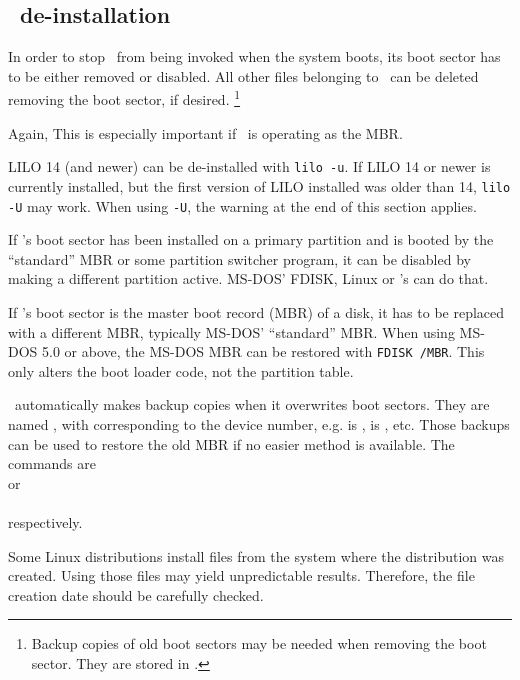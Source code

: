 \subsection{\LILO\ de-installation}
\label{deinst}

In order to stop \LILO\ from being invoked when the system boots, its
boot sector has to be either removed or disabled. All other files belonging
to \LILO\ can be deleted  removing the boot sector,
if desired.%
\footnote{Backup copies of old boot sectors may be needed when removing
the boot sector. They are stored in .}

Again,  This is
especially important if \LILO\ is operating as the MBR.

LILO 14 (and newer) can be de-installed with \verb"lilo -u". If LILO 14
or newer is currently installed, but the first version of LILO installed was
older than 14, \verb"lilo -U" may work. When using \verb"-U", the warning
at the end of this section applies.

If \LILO's boot sector has been installed on a primary partition and is
booted by the ``standard'' MBR or some partition switcher program, it can be
disabled by making a different partition active. MS-DOS' FDISK, Linux
 or \LILO's  can do that.

If \LILO's boot sector is the master boot record (MBR) of a disk, it has
to be replaced with a different MBR, typically MS-DOS' ``standard'' MBR.
When using MS-DOS 5.0 or above, the MS-DOS MBR can be restored with
\verb"FDISK /MBR". This only alters the boot loader code, not the
partition table.

\LILO\ automatically makes backup copies when it overwrites boot sectors.
They are named , with 
corresponding to the device number, e.g.  is ,
 is , etc. Those backups can be used to restore
the old MBR if no easier method is available. The commands are \\
 or \\
 \\
respectively.

 Some Linux distributions install 
files
from the system where the distribution was created. Using
those files may yield unpredictable results. Therefore, the file creation
date should be carefully checked.


